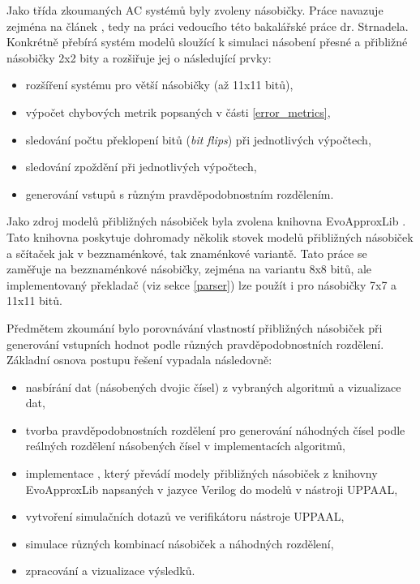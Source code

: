 Jako třída zkoumaných AC systémů byly zvoleny násobičky. Práce navazuje zejména na článek \cite{smc_axc}, tedy na práci vedoucího této bakalářské práce dr. Strnadela. Konkrétně přebírá systém modelů sloužící k simulaci násobení přesné a přibližné násobičky 2x2 bity a rozšiřuje jej o následující prvky:
\begin{itemize}
    \item rozšíření systému pro větší násobičky (až 11x11 bitů),
    \item výpočet chybových metrik popsaných v části \ref{error_metrics},
    \item sledování počtu překlopení bitů (\textit{bit flips}) při jednotlivých výpočtech,
    \item sledování zpoždění při jednotlivých výpočtech,
    \item generování vstupů s různým pravděpodobnostním rozdělením.
\end{itemize}

Jako zdroj modelů přibližných násobiček byla zvolena knihovna EvoApproxLib \cite{circuit_library}. Tato knihovna poskytuje dohromady několik stovek modelů přibližných násobiček a sčítaček jak v bezznaménkové, tak znaménkové variantě. Tato práce se zaměřuje na bezznaménkové násobičky, zejména na variantu 8x8 bitů, ale implementovaný překladač (viz sekce \ref{parser}) lze použít i pro násobičky 7x7 a 11x11 bitů.

\bigskip

Předmětem zkoumání bylo porovnávání vlastností přibližných násobiček při generování vstupních hodnot podle různých pravděpodobnostních rozdělení. Základní osnova postupu řešení vypadala následovně:

\begin{itemize}
    \item nasbírání dat (násobených dvojic čísel) z vybraných algoritmů a vizualizace dat,
    \item tvorba pravděpodobnostních rozdělení pro generování náhodných čísel podle reálných rozdělení násobených čísel v implementacích algoritmů,
    \item implementace , který převádí modely přibližných násobiček z knihovny EvoApproxLib \cite{circuit_library} napsaných v jazyce Verilog do modelů v nástroji UPPAAL,
    \item vytvoření simulačních dotazů ve verifikátoru nástroje UPPAAL,
    \item simulace různých kombinací násobiček a náhodných rozdělení, 
    \item zpracování a vizualizace výsledků.
\end{itemize}

